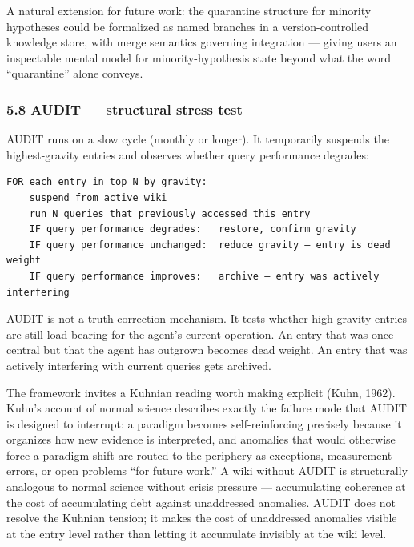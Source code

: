 \documentclass[
  11pt,
]{article}
\begin{document}
A natural extension for future work: the quarantine structure for
minority hypotheses could be formalized as named branches in a
version-controlled knowledge store, with merge semantics governing
integration --- giving users an inspectable mental model for
minority-hypothesis state beyond what the word ``quarantine'' alone
conveys.

\hypertarget{audit-structural-stress-test}{%
\subsubsection{5.8 AUDIT --- structural stress
test}\label{audit-structural-stress-test}}

AUDIT runs on a slow cycle (monthly or longer). It temporarily suspends
the highest-gravity entries and observes whether query performance
degrades:

\begin{verbatim}
FOR each entry in top_N_by_gravity:
    suspend from active wiki
    run N queries that previously accessed this entry
    IF query performance degrades:   restore, confirm gravity
    IF query performance unchanged:  reduce gravity — entry is dead weight
    IF query performance improves:   archive — entry was actively interfering
\end{verbatim}

AUDIT is not a truth-correction mechanism. It tests whether high-gravity
entries are still load-bearing for the agent's current operation. An
entry that was once central but that the agent has outgrown becomes dead
weight. An entry that was actively interfering with current queries gets
archived.

The framework invites a Kuhnian reading worth making explicit (Kuhn,
1962). Kuhn's account of normal science describes exactly the failure
mode that AUDIT is designed to interrupt: a paradigm becomes
self-reinforcing precisely because it organizes how new evidence is
interpreted, and anomalies that would otherwise force a paradigm shift
are routed to the periphery as exceptions, measurement errors, or open
problems ``for future work.'' A wiki without AUDIT is structurally
analogous to normal science without crisis pressure --- accumulating
coherence at the cost of accumulating debt against unaddressed
anomalies. AUDIT does not resolve the Kuhnian tension; it makes the cost
of unaddressed anomalies visible at the entry level rather than letting
it accumulate invisibly at the wiki level.
\end{document}
